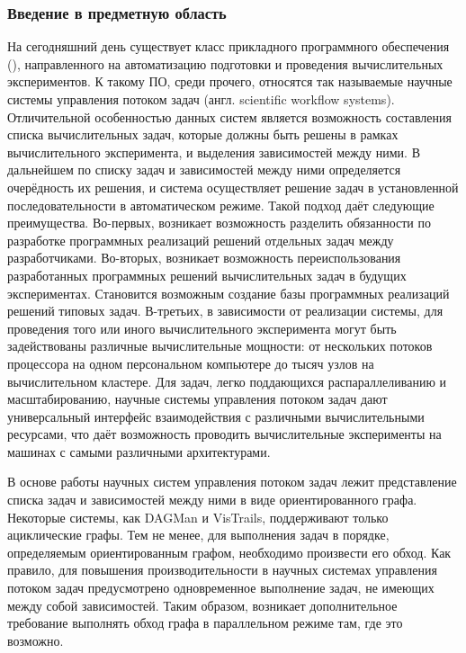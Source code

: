 \def\notedate{2023.01.07}
\def\currentauthor{Тришин И.В. (РК6-11М)}
\subsubsection{Введение в предметную область}
На сегодняшний день существует класс прикладного программного обеспечения (), направленного на автоматизацию подготовки и проведения вычислительных экспериментов. К такому ПО, среди прочего, относятся так называемые научные системы управления потоком задач (англ. scientific workflow systems). Отличительной особенностью данных систем является возможность составления списка вычислительных задач, которые должны быть решены в рамках вычислительного эксперимента, и выделения зависимостей между ними. В дальнейшем по списку задач и зависимостей между ними определяется очерёдность их решения, и система осуществляет решение задач в установленной последовательности в автоматическом режиме. Такой подход даёт следующие преимущества. Во-первых, возникает возможность разделить обязанности по разработке программных реализаций решений отдельных задач между разработчиками. Во-вторых, возникает возможность переиспользования разработанных программных решений вычислительных задач в будущих экспериментах. Становится возможным создание базы программных реализаций решений типовых задач. В-третьих, в зависимости от реализации системы, для проведения того или иного вычислительного эксперимента могут быть задействованы различные вычислительные мощности: от нескольких потоков процессора на одном персональном компьютере до тысяч узлов на вычислительном кластере. Для задач, легко поддающихся распараллеливанию и масштабированию, научные системы управления потоком задач дают универсальный интерфейс взаимодействия с различными вычислительными ресурсами, что даёт возможность проводить вычислительные эксперименты на машинах с самыми различными архитектурами.

В основе работы научных систем управления потоком задач лежит представление списка задач и зависимостей между ними в виде ориентированного графа. Некоторые системы, как DAGMan\cite{DAGMan2023} и VisTrails\cite{VTDoc2016}, поддерживают только ациклические графы. Тем не менее, для выполнения задач в порядке, определяемым ориентированным графом, необходимо произвести его обход. Как правило, для повышения производительности в научных системах управления потоком задач предусмотрено одновременное выполнение задач, не имеющих между собой зависимостей. Таким образом, возникает дополнительное требование выполнять обход графа в параллельном режиме там, где это возможно.

